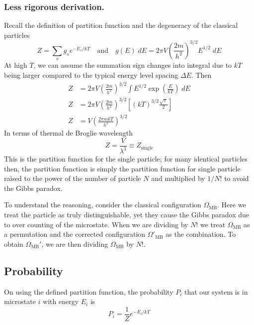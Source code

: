 \documentclass[../../../Main.tex]{subfiles}
\begin{document}
\subsubsection*{Less rigorous derivation.} Recall the definition of partition function and the degeneracy of the classical particles
\begin{equation*}
    Z=\sum_{s} g_se^{-E_s/kT}\quad\text{and}\quad g(E)\;dE=2\pi V\left(\frac{2m}{h^2}\right)^{3/2}E^{1/2}\;dE
\end{equation*}
At high $T$, we can assume the summation sign changes into integral due to $kT$ being larger compared to the typical energy level spacing $\Delta E$. Then 
\begin{align*}
    Z&=2\pi V\left(\frac{2m}{h^2}\right)^{3/2}\int E^{1/2}\exp \left(\frac{E}{kT}\right)\;dE\\
    Z&=2\pi V\left(\frac{2m}{h^2}\right)^{3/2}\left[(kT)^{3/2}\frac{\sqrt{\pi}}{2}\right]\\
    Z&=V\left(\frac{2\pi mkT}{h^2}\right)^{3/2}
\end{align*}
In terms of thermal de Broglie wavelength
\begin{equation*}
    Z=\frac{V}{\lambda^3}\equiv Z_\text{single}
\end{equation*}
This is the partition function for the single particle; for many identical particles then, the partition function is simply the partition function for single particle raised to the power of the number of particle $N$ and multiplied by $1/N!$ to avoid the Gibbs paradox.

To understand the reasoning, consider the classical configuration $\Omega_\text{MB}$. Here we treat the particle as truly distinguishable, yet they cause the Gibbs paradox due to over counting of the microstate. When we are dividing by $N!$ we treat $\Omega_\text{MB}$ as a permutation and the corrected configuration $\Omega'_\text{MB}$ as the combination. To obtain $\Omega_\text{MB}'$, we are then dividing $\Omega_\text{MB}$ by $N!$.

\subsection*{Probability}
On using the defined partition function, the probability $P_i$ that our system is in microstate $i$ with energy $E_i$ is
\begin{equation*}
    P_i=\frac{1}{Z}e^{-E_i/kT}
\end{equation*}
\end{document}
